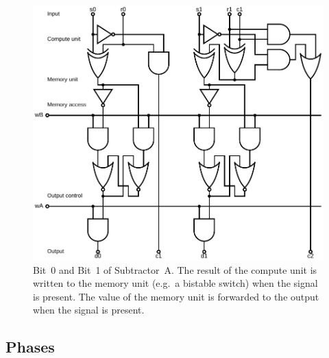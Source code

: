 \documentclass[12pt,notitlepage]{article}
\begin{document}
\begin{figure}[phbt]
\centering
\includegraphics[width=0.9\linewidth]{circuits/Logical-HalfSubtractor0.svg.pdf}
%
\caption{%
Bit~0 and Bit~1
of
Subtractor~A.
%
The result of the compute unit is written to the memory unit
(e.g.~a bistable switch)
when the signal  is present.
%
The value of the memory unit is
forwarded to the output
when the signal  is present.
}
\label{f:logical-subtractor01}
\end{figure}



\subsection{Phases}
\end{document}
